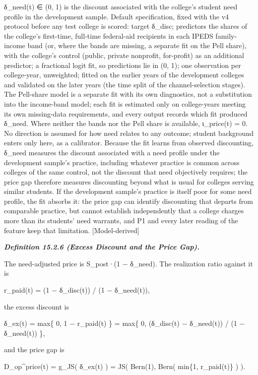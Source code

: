 \documentclass[
]{article}
\begin{document}
δ\_need(t) ∈ (0, 1) is the discount associated with the college's
student need profile in the development sample. Default specification,
fixed with the v4 protocol before any test college is scored: target
δ\_disc; predictors the shares of the college's first-time, full-time
federal-aid recipients in each IPEDS family-income band (or, where the
bands are missing, a separate fit on the Pell share), with the college's
control (public, private nonprofit, for-profit) as an additional
predictor; a fractional logit fit, so predictions lie in (0, 1); one
observation per college-year, unweighted; fitted on the earlier years of
the development colleges and validated on the later years (the time
split of the channel-selection stages). The Pell-share model is a
separate fit with its own diagnostics, not a substitution into the
income-band model; each fit is estimated only on college-years meeting
its own missing-data requirements, and every output records which fit
produced δ\_need. Where neither the bands nor the Pell share is
available, ι\_price(t) = 0. No direction is assumed for how need relates
to any outcome; student background enters only here, as a calibrator.
Because the fit learns from observed discounting, δ\_need measures the
discount associated with a need profile under the development sample's
practice, including whatever practice is common across colleges of the
same control, not the discount that need objectively requires; the price
gap therefore measures discounting beyond what is usual for colleges
serving similar students. If the development sample's practice is itself
poor for some need profile, the fit absorbs it: the price gap can
identify discounting that departs from comparable practice, but cannot
establish independently that a college charges more than its students'
need warrants, and P1 and every later reading of the feature keep that
limitation. {[}Model-derived{]}

\emph{\textbf{Definition 15.2.6 (Excess Discount and the Price Gap).}}

The need-adjusted price is S\_post·(1 − δ\_need). The realization ratio
against it is

r\_paid(t) = (1 − δ\_disc(t)) / (1 − δ\_need(t)),

the excess discount is

δ\_ex(t) = max\{ 0, 1 − r\_paid(t) \} = max\{ 0, (δ\_disc(t) −
δ\_need(t)) / (1 − δ\_need(t)) \},

and the price gap is

D\_op\^{}price(t) = g\_JS( δ\_ex(t) ) = JS( Bern(1), Bern( min\{1,
r\_paid(t)\} ) ).
\end{document}
